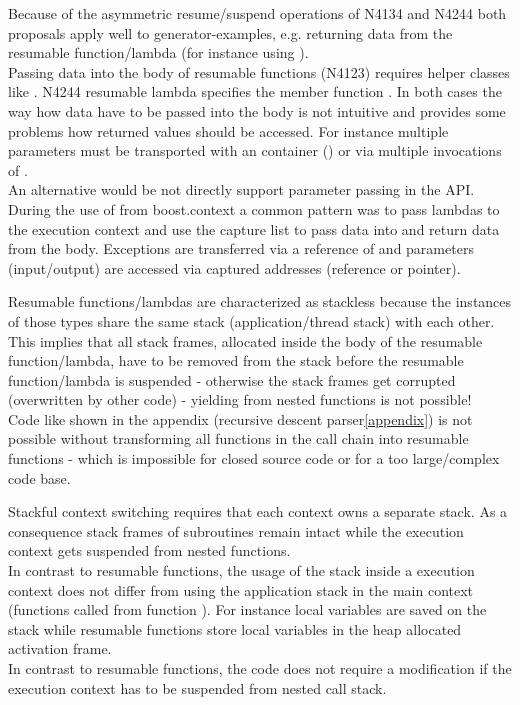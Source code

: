 Because of the asymmetric resume/suspend operations of N4134 and N4244 both
proposals apply well to generator-examples, e.g. returning data from the
resumable function/lambda (for instance using \yield).\\
Passing data into the body of resumable functions (N4123) requires helper
classes like \channel.
N4244 resumable lambda specifies the member function \rlwanted.
In both cases the way how data have to be passed into the body is not intuitive
and provides some problems how returned values should be accessed. For instance
multiple parameters must be transported with an container (\tuple) or via
multiple invocations of \rlwanted.\\
\newline
An alternative would be not directly support parameter passing in the API.\\
During the use of  from boost.context\cite{bcontext} a
common pattern was to pass lambdas to the execution context and use the capture
list to pass data into and return data from the body. Exceptions are transferred
via a reference of \excpt and parameters (input/output) are accessed via
captured addresses (reference or pointer).



\label{stackless}
Resumable functions/lambdas are characterized as stackless because the instances
of those types share the same stack (application/thread stack) with each other.\\
This implies that all stack frames, allocated inside the body of the resumable
function/lambda, have to be removed from the stack before the resumable
function/lambda is suspended - otherwise the stack frames get corrupted
(overwritten by other code) - yielding from nested functions is not possible!\\
Code like shown in the appendix (recursive descent parser\ref{appendix}) is not
possible without transforming all functions in the call chain into resumable
functions - which is impossible for closed source code or for a too
large/complex code base.

Stackful context switching requires that each context owns a separate stack.
As a consequence stack frames of subroutines remain intact while the execution
context gets suspended from nested functions.\\
In contrast to resumable functions, the usage of the stack inside a execution
context does not differ from using the application stack in the main context
(functions called from function \main). For instance local variables are saved
on the stack while resumable functions store local variables in the heap
allocated activation frame.\\
In contrast to resumable functions, the code does not require a modification if
the execution context has to be suspended from nested call stack.



